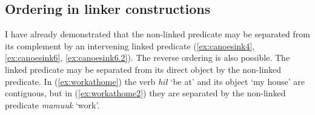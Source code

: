 \begin{comment}
ACTUALLY*2: This works quite well for showing a deictic predicate. Unfortunately it is XL so I cannot use it. Oh well!

ACTUALLY! I think the below is wrong. If you look at XL's sentence, the predicate is deictic ʔaḥʔaa, to which the linker still attaches! This would mean the only counterexample would be Adv V+link. Investigate this further.

But occasionally the linker may occur on the sole predicate in a sentence. This appears to contradict examples (\ref{ex:someonespoke}) and (\ref{ex:*someonespoke}), but the translation provided for these ``dangling" linkers always indicates they are notionally attached to the preceding sentence. I have 1 (TODO: look for more, update number) example from my corpus, involving the word \textit{qʷis} `do so'.\footnote{I am not here counting examples from \textit{tupaat} Julia Lucas, who is unique in always uses the the conjunction \textit{ʔunʔuuƛ} with a linker attached. I believe she has a different lexical entry for the word, and will explain in section (TODO).} I give one example below:

TODO, this is from Charlie Lucas, who I do not have permissions to share. Update it with a sharable example.

Context: \textit{łačiƛni wa. ʔuušciłʔap̓aƛukni nunuuk. ʔuušciłʔap̓aƛukni huyaał.} `We've let it go, haven't we? It has become hard for us to sing. It has become hard for us to dance.'

\ex \label{ex:danglinglinker}
\begingl
\glpreamble ʔaḥʔaa qʷisḥnii.//
\gla ʔaḥʔaa qʷis-(q)ḥ=niˑ //
\glb DDYN do.so-\textsc{link}=\textsc{neut.1pl} //
\glft `That's what happened to us.' //
\endgl
\xe

Although the one predicate is 

\end{comment}

\subsection{Ordering in linker constructions} \label{sec:link:participants}

I have already demonstrated that the non-linked predicate may be separated from its complement by an intervening linked predicate (\ref{ex:canoesink4}, \ref{ex:canoesink6}, \ref{ex:canoesink6.2}). The reverse ordering is also possible. The linked predicate may be separated from its direct object by the non-linked predicate. In (\ref{ex:workathome}) the verb \textit{hił} `be at' and its object `my house' are contiguous, but in (\ref{ex:workathome2}) they are separated by the non-linked predicate \textit{mamuuk} `work'.

